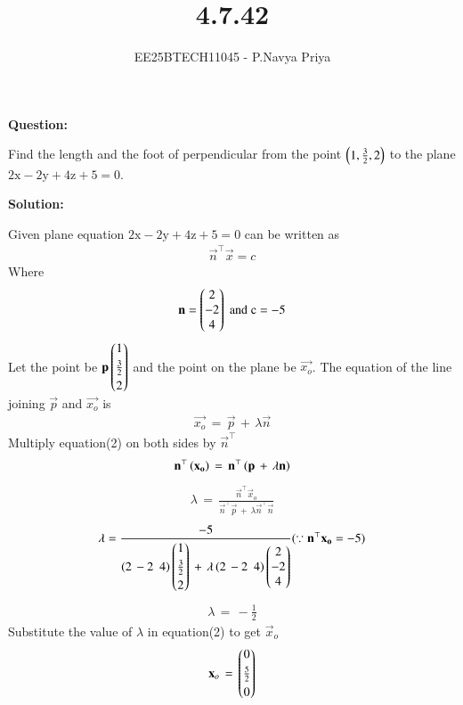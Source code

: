 \documentclass[journal,12pt,onecolumn]{IEEEtran}
\theoremstyle{remark}
\begin{document}
\title{4.7.42}
\author{EE25BTECH11045 - P.Navya Priya}
\maketitle
\renewcommand{\thefigure}{\theenumi}
\renewcommand{\thetable}{\theenumi}
\textbf{Question:}

Find the length and the foot of perpendicular from the point $\left(1,\frac{3}{2},2\right)$ to the plane $2\text{x}-2\text{y}+4\text{z}+5=0$.

\textbf{Solution:}

Given plane equation $2\text{x}-2\text{y}+4\text{z}+5=0$ can be written as 
\begin{align}
    \vec{n}^\top\vec{x}=c
\end{align}
Where
\begin{align*} 
    \mathbf{n}=\begin{pmatrix}2\\-2\\4\end{pmatrix}\;\text{and}\;\text{c}=-5
\end{align*}
Let the point be $\mathbf{p}\begin{pmatrix}1\\[3pt]\frac{3}{2}\\[3pt]2\end{pmatrix}$ and the point on the plane be $\vec{x_o}$. The equation of the line joining $\vec{p}$ and $\vec{x_o}$ is
\begin{align}
    \vec{x_o}\,=\,\vec{p}\,+\,\lambda\vec{n}
\end{align}
Multiply equation(2) on both sides by $\vec{n}^\top$
\begin{align}
\mathbf{n}^\top\left(\mathbf{x_o}\right)\,=\,\mathbf{n}^\top\left(\mathbf{p}\,+\,\lambda\mathbf{n}\right)
\end{align}
\begin{align}
\lambda\,=\,\frac{\vec{n}^\top\vec{x}_o}{\vec{n}^\top\vec{p}\,+\,\lambda\vec{n}^\top\vec{n}}
\end{align}
\begin{align}
    \lambda=\frac{-5}{\left(2\,-2\,\,\,4\right)\begin{pmatrix}1\\[3pt]\frac{3}{2}\\[3pt]2\end{pmatrix}\,+\,\lambda\left(2\,-2\,\,\,4\right)\begin{pmatrix}2\\-2\\4\end{pmatrix}}(\because \mathbf{n}^\top\mathbf{x_o}=-5)
\end{align}
\begin{align}
    \lambda\,=\,-\frac{1}{2}
\end{align}
Substitute the value of $\lambda$ in equation(2) to get $\vec{x}_o$
\begin{align}
    \mathbf{x}_o\,=\,\begin{pmatrix}0\\[3pt]\frac{5}{2}\\[3pt]0\end{pmatrix}
\end{align}
\end{document}

